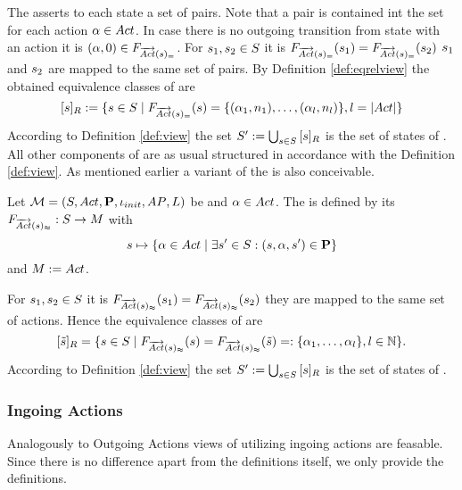 \documentclass[preview]{standalone}
\begin{document}
The \grpfctN asserts to each state a set of pairs. Note that a pair is contained int the set for each action ${\alpha} \in {Act}$. In case there is no outgoing transition from state \state with an action \action it is $({\alpha}, 0) \in {\ensuremath{{F_{{\overrightarrow{{Act}}}({s})_=}}}}$. For ${s}_1, {s}_2 \in {S}$ it is ${{F_{{\overrightarrow{{Act}}}({s})_=}}}({s}_1) = {{F_{{\overrightarrow{{Act}}}({s})_=}}}({s}_2)$ \iffN ${s}_1$ and ${s}_2$ are mapped to the same set of pairs. By Definition \ref{def:eqrelview} the obtained equivalence classes of \eqrelview are
\[
	{{[{s}]_{{R}}}} := \{{s} \in {S} \mid {\ensuremath{{F_{{\overrightarrow{{Act}}}({s})_=}}}}({s}) = \{({\alpha}_1, {n}_1), \dots, ({\alpha}_l, {n}_l)\}, l = |{Act}|\}
\]
According to Definition \ref{def:view} the set ${S}' := \bigcup_{{s} \in {S}} {{[{s}]_{{R}}}}$ is the set of states of \viewstrongoutactident. All other components of \viewstrongoutactident are as usual structured in accordance with the Definition \ref{def:view}.
As mentioned earlier a \outactidentweak variant of the \outactident \viewN is also conceivable.

\begin{definition}
	Let ${{{\mathcal{M}}}} = {{({S}, {Act}, {\textbf{P}}, {\iota_{init}}, {AP}, {L})}}$ be \achgphN and ${\alpha} \in {Act}$. The \viewN \viewweakoutactident is defined by its \grpfctN ${{F_{{\overrightarrow{{Act}}}({s})_\approx}}} : {S} \to {\ensuremath{{M}}}$ with
	\[
	{s} \mapsto \{{\alpha} \in {Act} \mid \exists {s}' \in {S} : ({s}, {\alpha}, {s}') \in {\ensuremath{{\textbf{P}}}}\} 	
	\]
	and ${{M}} := {Act}$.
\end{definition}


For ${s}_1, {s}_2 \in {S}$ it is ${{F_{{\overrightarrow{{Act}}}({s})_\approx}}}({s}_1) = {{F_{{\overrightarrow{{Act}}}({s})_\approx}}}({s}_2)$ \iffN they are mapped to the same set of actions. Hence the equivalence classes of \eqrelview are
\[
	{{[{\tilde{{s}}}]_{{R}}}} = \{ {s} \in {S} \mid {\ensuremath{{F_{{\overrightarrow{{Act}}}({s})_\approx}}}}({s}) = {{F_{{\overrightarrow{{Act}}}({s})_\approx}}}({\tilde{{s}}}) =: \{{\alpha}_1, \dots, {\alpha}_l\}, l \in {\mathbb{N}}\}.
\]
According to Definition \ref{def:view} the set ${S}' := \bigcup_{{s} \in {S}} {{[{s}]_{{R}}}}$ is the set of states of \viewweakoutactident.

\subsubsection{Ingoing Actions}
Analogously to Outgoing Actions views of utilizing ingoing actions are feasable. Since there is no difference apart from the definitions itself, we only provide the definitions.
\end{document}
